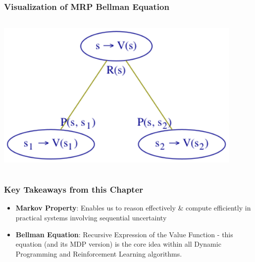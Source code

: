 \documentclass[handout]{beamer}
\begin{document}
\begin{frame}
\frametitle{Visualization of MRP Bellman Equation}
\includegraphics[width=12cm, height=8cm]{mrp_bellman_tree.png}
\end{frame}

\begin{frame}
\frametitle{Key Takeaways from this Chapter}
\pause
\begin{itemize}[<+->]
\item {\bf Markov Property}: Enables us to reason effectively \& compute efficiently in practical systems involving sequential uncertainty
\item {\bf Bellman Equation}: Recursive Expression of the Value Function - this equation (and its MDP version) is the core idea within all Dynamic Programming and Reinforcement Learning algorithms.
\end{itemize}
\end{frame}
\end{document}
